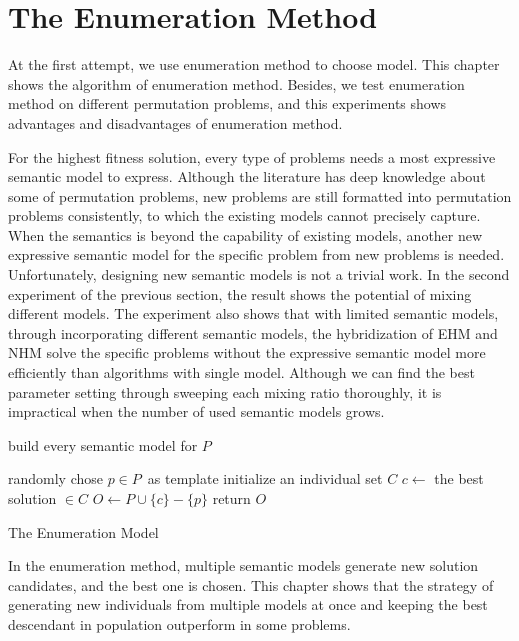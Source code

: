 \section{The Enumeration Method}

At the first attempt, we use enumeration method to choose model. This chapter shows the algorithm of enumeration method. Besides, we test enumeration method on different permutation problems, and this experiments shows advantages and disadvantages of enumeration method.

For the highest fitness solution, every type of problems needs a most expressive semantic model to express. Although the literature has deep knowledge about some of permutation problems, new problems are still formatted into permutation problems consistently, to which the existing models cannot precisely capture. When the semantics is beyond the capability of existing models, another new expressive  semantic model for the specific problem from new problems is needed. Unfortunately, designing new semantic models is not a trivial work. In the second experiment of the previous section, the result shows the potential of mixing different models. The experiment also shows that with limited semantic models, through incorporating different semantic models, the hybridization of EHM and NHM solve the specific problems without the expressive semantic model more efficiently than algorithms with single model. Although we can find the best parameter setting through sweeping each mixing ratio thoroughly, it is impractical when the number of used semantic models grows.


{\LinesNumbered
\begin{algorithm}[htbp]

        build every semantic model for $P$\;
        
        randomly chose $p \in P$\ as template\; 
        initialize an individual set $C$ \;
        $c \leftarrow$ the best solution $\in C$\;
        $O \leftarrow P \cup \{c\} - \{p\}$\;
        return $O$\;
    \caption{The Enumeration Model}
    \label{alg:enumeration_method}
\end{algorithm}}

In the enumeration method, multiple semantic models generate new solution candidates, and the best one is chosen. This chapter shows that the strategy of generating new individuals from multiple models at once and keeping the best descendant in population outperform in some problems. 

